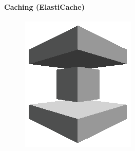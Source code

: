 \documentclass[
12pt,
english,
ngerman,
headsepline,
twoside,
openright,
numbers=noenddot,version=first
]{scrreprt}
\begin{document}
\paragraph{Caching (ElastiCache)}
\begin{figure}
	\includegraphics[width=0.9\linewidth]{./pics/aws/Database_GRAYSCALE_AmazonElasticCache.eps}
\end{figure}
\end{document}
